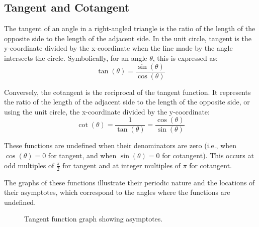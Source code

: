 \documentclass[a4paper,12pt]{book}
\begin{document}
\subsection{Tangent and Cotangent}
\label{subsec:tangent_cotangent}

The tangent of an angle in a right-angled triangle is the ratio of the length of the opposite side to the length of the adjacent side. In the unit circle, tangent is the y-coordinate divided by the x-coordinate when the line made by the angle intersects the circle. Symbolically, for an angle \(\theta\), this is expressed as:
\[
\tan(\theta) = \frac{\sin(\theta)}{\cos(\theta)}
\]

Conversely, the cotangent is the reciprocal of the tangent function. It represents the ratio of the length of the adjacent side to the length of the opposite side, or using the unit circle, the x-coordinate divided by the y-coordinate:
\[
\cot(\theta) = \frac{1}{\tan(\theta)} = \frac{\cos(\theta)}{\sin(\theta)}
\]

These functions are undefined when their denominators are zero (i.e., when \(\cos(\theta) = 0\) for tangent, and when \(\sin(\theta) = 0\) for cotangent). This occurs at odd multiples of \(\frac{\pi}{2}\) for tangent and at integer multiples of \(\pi\) for cotangent.

The graphs of these functions illustrate their periodic nature and the locations of their asymptotes, which correspond to the angles where the functions are undefined.

\begin{figure}[h]
\centering
{}
\caption{Tangent function graph showing asymptotes.}
\end{figure}
\end{document}
